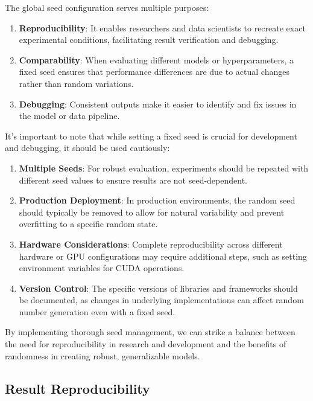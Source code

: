 The global seed configuration serves multiple purposes:

\begin{enumerate}
    \item \textbf{Reproducibility}: It enables researchers and data scientists to recreate exact experimental conditions, facilitating result verification and debugging.
    
    \item \textbf{Comparability}: When evaluating different models or hyperparameters, a fixed seed ensures that performance differences are due to actual changes rather than random variations.
    
    \item \textbf{Debugging}: Consistent outputs make it easier to identify and fix issues in the model or data pipeline.
\end{enumerate}


It's important to note that while setting a fixed seed is crucial for development and debugging, it should be used cautiously:

\begin{enumerate}
    \item \textbf{Multiple Seeds}: For robust evaluation, experiments should be repeated with different seed values to ensure results are not seed-dependent.
    
    \item \textbf{Production Deployment}: In production environments, the random seed should typically be removed to allow for natural variability and prevent overfitting to a specific random state.
    
    \item \textbf{Hardware Considerations}: Complete reproducibility across different hardware or GPU configurations may require additional steps, such as setting environment variables for CUDA operations.
    
    \item \textbf{Version Control}: The specific versions of libraries and frameworks should be documented, as changes in underlying implementations can affect random number generation even with a fixed seed.
\end{enumerate}

By implementing thorough seed management, we can strike a balance between the need for reproducibility in research and development and the benefits of randomness in creating robust, generalizable models.

\subsection{Result Reproducibility}


